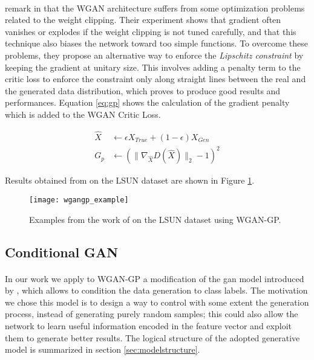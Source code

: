 \paragraph{} \citeauthor{wgangp} remark in \cite{wgangp} that the WGAN architecture suffers from some optimization problems related to the weight clipping. Their experiment shows that gradient often vanishes or explodes if the weight clipping is not tuned carefully, and that this technique also biases the network toward too simple functions. To overcome these problems, they propose an alternative way to enforce the \textit{Lipschitz constraint} by keeping the gradient at unitary size. This involves adding a penalty term to the critic loss to enforce the constraint only along straight lines between the real and the generated data distribution, which proves to produce good results and performances.
Equation \ref{eq:gp} shows the calculation of the gradient penalty which is added to the WGAN Critic Loss.

\begin{equation}
\label{eq:gp}
\begin{split}
\hat{X} & \gets \epsilon X_{True} + (1-\epsilon) X_{Gen} \\
G_p & \gets (\| \nabla_{\hat{X}}D(\hat{X}) \|_2 - 1 )^2
\end{split}
\end{equation}

Results obtained from \citeauthor{wgangp} on the LSUN dataset are shown in Figure \ref{fig:wgangp}.
\begin{figure}[h!]
	\begin{center}
		\texttt{[image: wgangp\_example]}
	\end{center}
	
	\captionsetup{width=1\linewidth}
	\caption[Samples from WGAN-GP, \citeauthor{wgangp}]{Examples from the work of \citeauthor{wgangp} on the LSUN dataset using WGAN-GP. \cite[p.8]{wgangp}}
	\label{fig:wgangp}
	\medskip
\end{figure}

\FloatBarrier

\subsection{Conditional GAN}
\paragraph{} In our work we apply to WGAN-GP a modification of the \gls{gan} model introduced by \citeauthor{conditionalgan} \cite{conditionalgan} , which allows to condition the data generation to class labels. The motivation we chose this model is to design a way to control with some extent the generation process, instead of generating purely random samples; this could also allow the network to learn useful information encoded in the feature vector and exploit them to generate better results. The logical structure of the adopted generative model is summarized in section \ref{sec:modelstructure}.


